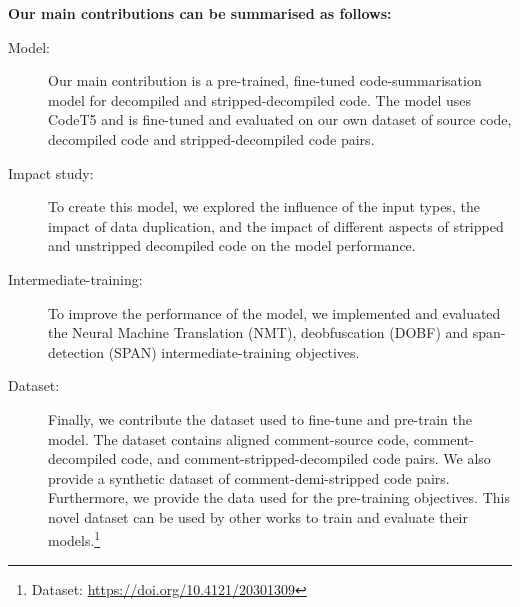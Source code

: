 \textbf{Our main contributions can be summarised as follows:}
\begin{description}
 \item[Model:] Our main contribution is a pre-trained, fine-tuned code-summarisation model for decompiled and stripped-decompiled code. The model uses CodeT5 and is fine-tuned and evaluated on our own dataset of source code, decompiled code and stripped-decompiled code pairs. 
 \item[Impact study:] To create this model, we explored the influence of the input types, the impact of data duplication, and the impact of different aspects of stripped and unstripped decompiled code on the model performance.
 \item[Intermediate-training:] To improve the performance of the model, we implemented and evaluated the Neural Machine Translation (NMT), deobfuscation (DOBF) and span-detection (SPAN) intermediate-training objectives. 
 \item[Dataset:] Finally, we contribute the dataset used to fine-tune and pre-train the model. The dataset contains aligned comment-source code, comment-decompiled code, and comment-stripped-decompiled code pairs. We also provide a synthetic dataset of comment-demi-stripped code pairs. Furthermore, we provide the data used for the pre-training objectives. This novel dataset can be used by other works to train and evaluate their models.\footnote{Dataset: \url{https://doi.org/10.4121/20301309}}
\end{description}

